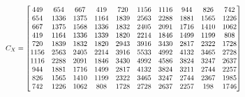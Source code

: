 \begin{equation}\resizebox{.7\textwidth}{!}{$
C_X = \begin{bmatrix}
449 & 654 & 667 & 419 & 720 & 1156 & 1116 & 944 & 826 & 742\\
654 & 1336 & 1375 & 1164 & 1839 & 2563 & 2288 & 1881 & 1565 & 1226\\
667 & 1375 & 1568 & 1336 & 1832 & 2405 & 2091 & 1716 & 1410 & 1062\\
419 & 1164 & 1336 & 1339 & 1820 & 2214 & 1846 & 1499 & 1199 & 808\\
720 & 1839 & 1832 & 1820 & 2943 & 3916 & 3430 & 2817 & 2322 & 1728\\
1156 & 2563 & 2405 & 2214 & 3916 & 5533 & 4992 & 4132 & 3465 & 2728\\
1116 & 2288 & 2091 & 1846 & 3430 & 4992 & 4586 & 3824 & 3247 &   2637\\
944 & 1881 & 1716 & 1499 & 2817 & 4132 & 3824 & 3211 & 2744 & 2257\\
826 & 1565 & 1410 & 1199 & 2322 & 3465 & 3247 & 2744 & 2367 & 1985\\
742 & 1226 & 1062 & 808 & 1728 & 2728 & 2637 & 2257 & 198 & 1746\\
\end{bmatrix}$}
\end{equation}

